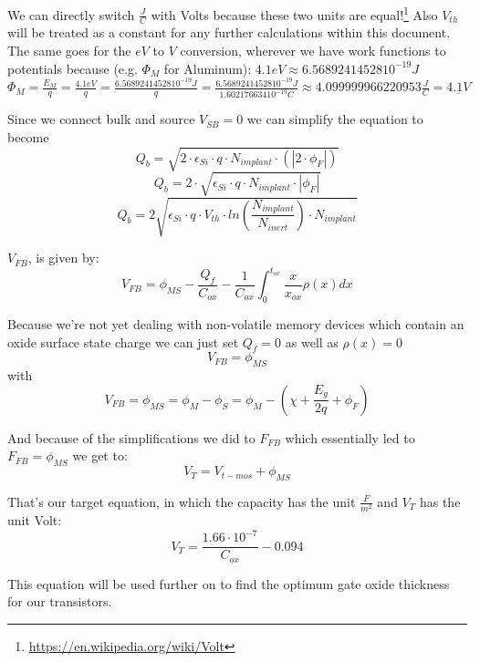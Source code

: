 \begin{mdframed}[linewidth=2pt,linecolor=red]
We can directly switch $\frac{J}{C}$ with Volts because these two units are equal!\footnote{\url{https://en.wikipedia.org/wiki/Volt}}
Also $V_{th}$ will be treated as a constant for any further calculations within this document.\\

The same goes for the $eV$ to $V$ conversion, wherever we have work functions to potentials because (e.g. $\Phi_M$ for Aluminum):
$4.1 eV \approx 6.56892414528 10^{-19}J$ \\
$\Phi_M=\frac{E_M}{q}=\frac{4.1 eV}{q}=\frac{6.56892414528 10^{-19} J}{q} = \frac{6.56892414528 10^{-19} J}{1.602176634 10^{-19} C} \approx 4.099999966220953 \frac{J}{C} = \underline{4.1V}$
\end{mdframed}

Since we connect bulk and source $V_{SB}=0$ we can simplify the equation to become
\begin{equation}
Q_b
=
\sqrt{2\cdot\epsilon_{Si}\cdot q\cdot N_{implant} \cdot  ( \left| 2 \cdot \phi_F \right|) }
\end{equation}
\begin{equation}
Q_b
=
2\cdot\sqrt{\epsilon_{Si}\cdot q\cdot N_{implant}\cdot \left| \phi_F \right| }
\end{equation}
\begin{equation}
Q_b
=
2 \sqrt{\epsilon_{Si}\cdot q\cdot V_{th}\cdot ln\left(\frac{N_{implant}}{N_{inert}}\right) \cdot N_{implant} }
\end{equation}


$V_{FB}$, is given by:
\begin{equation}
V_{FB}
=
\phi_{MS}-\frac{Q_f}{C_{ox}}-\frac{1}{C_{ox}}\int_{0}^{t_{ox}}\frac{x}{x_{ox}}\rho(x) dx
\end{equation}

Because we're not yet dealing with non-volatile memory devices which contain an oxide surface state charge we can just set $Q_f=0$ as well as $\rho(x)=0$
\begin{equation}
V_{FB}
=
\phi_{MS}
\end{equation}
with
\begin{equation}
V_{FB}
=
\phi_{MS}
=
\phi_{M} - \phi_{S}
=
\phi_{M} -  \left(\chi + \frac{E_g}{2 q} + \phi_F \right)
\end{equation}

And because of the simplifications we did to $F_{FB}$ which essentially led to $F_{FB}=\phi_{MS}$ we get to:
\begin{equation}
V_T = V_{t-mos} + \phi_{MS}
\end{equation}

That's our target equation, in which the capacity has the unit $\frac{F}{m^2}$ and $V_T$ has the unit Volt:
\begin{equation}
\boxed{
V_T= \frac{1.66 \cdot 10^{-7}}{C_{ox}}-0.094
}
\end{equation}

This equation will be used further on to find the optimum gate oxide thickness for our transistors.
